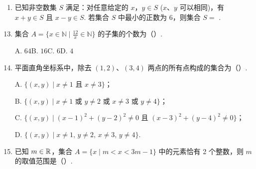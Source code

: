 \documentclass[a4paper,11pt]{article}
\begin{document}
\begin{enumerate}
\fi
\item 已知非空数集 $S$ 满足：对任意给定的 $x$，$y\in S$ ($x$、$y$ 可以相同)，有 $x+y\in S$ 且 $x-y\in S$. 若集合 $S$ 中最小的正数为 6，则集合 $S=$ \blankline[2em].


\ifanswer
\solbegin
{}
\solend

\fi
\end{enumerate}


\begin{enumerate}
\setcounter{enumi}{12}

\item 集合 $A=\{x\in\mathbb{N}\mid\tfrac{12}{x}\in\mathbb{N}\}$ 的子集的个数为\mbox{（\quad）.}

\keepwithprev
A. $64$\qquad B. $16$\qquad C. $6$\qquad D. $4$


\ifanswer
\solbegin
{}
\solend

\fi

\item 平面直角坐标系中，除去 $(1,2)$、$(3,4)$ 两点的所有点构成的集合为\mbox{（\quad）.}

\keepwithprev
A. $\{(x,y)\mid x\neq 1\text{ 且 }x\neq 3\}$；

B. $\{(x,y)\mid x\neq 1\text{ 或 }y\neq 2\text{ 或 }x\neq 3\text{ 或 }y\neq 4\}$；

C. $\{(x,y)\mid (x-1)^2+(y-2)^2\neq 0\text{ 且 }(x-3)^2+(y-4)^2\neq 0\}$；

D. $\{(x,y)\mid x\neq 1,\,y\neq 2,\,x\neq 3,\,y\neq 4\}$.


\item 已知 $m\in\mathbb{R}$，集合 $A=\{x\mid m<x<3m-1\}$ 中的元素恰有 2 个整数，则 $m$ 的取值范围是\mbox{（\quad）.}


\end{enumerate}
\end{document}
